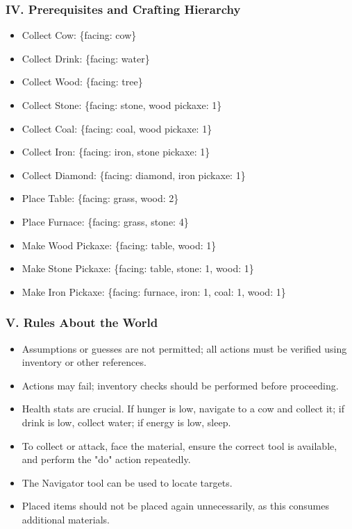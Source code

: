 \subsubsection{IV. Prerequisites and Crafting Hierarchy}
\begin{itemize}[label={}]
    \item Collect Cow: \{facing: cow\}
    \item Collect Drink: \{facing: water\}
    \item Collect Wood: \{facing: tree\}
    \item Collect Stone: \{facing: stone, wood pickaxe: 1\}
    \item Collect Coal: \{facing: coal, wood pickaxe: 1\}
    \item Collect Iron: \{facing: iron, stone pickaxe: 1\}
    \item Collect Diamond: \{facing: diamond, iron pickaxe: 1\}
    \item Place Table: \{facing: grass, wood: 2\}
    \item Place Furnace: \{facing: grass, stone: 4\}
    \item Make Wood Pickaxe: \{facing: table, wood: 1\}
    \item Make Stone Pickaxe: \{facing: table, stone: 1, wood: 1\}
    \item Make Iron Pickaxe: \{facing: furnace, iron: 1, coal: 1, wood: 1\}
\end{itemize}

\subsubsection{V. Rules About the World}
\begin{itemize}[label={}]
    \item Assumptions or guesses are not permitted; all actions must be verified using inventory or other references.
    \item Actions may fail; inventory checks should be performed before proceeding.
    \item Health stats are crucial. If hunger is low, navigate to a cow and collect it; if drink is low, collect water; if energy is low, sleep.
    \item To collect or attack, face the material, ensure the correct tool is available, and perform the "do" action repeatedly.
    \item The Navigator tool can be used to locate targets.
    \item Placed items should not be placed again unnecessarily, as this consumes additional materials.
\end{itemize}



